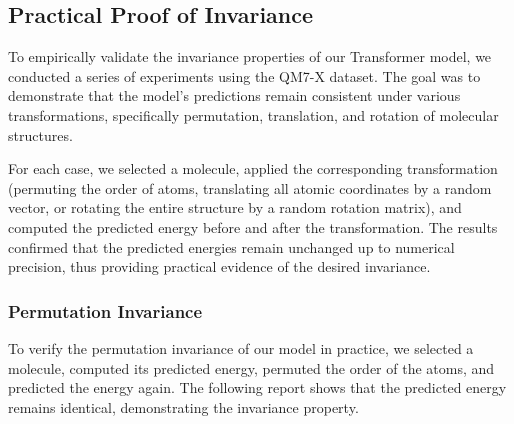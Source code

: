 \documentclass{article}
\begin{document}
\subsection{Practical Proof of Invariance}

To empirically validate the invariance properties of our Transformer model, we conducted a series of experiments using the QM7-X dataset. The goal was to demonstrate that the model's predictions remain consistent under various transformations, specifically permutation, translation, and rotation of molecular structures. \newline

For each case, we selected a molecule, applied the corresponding transformation (permuting the order of atoms, translating all atomic coordinates by a random vector, or rotating the entire structure by a random rotation matrix), and computed the predicted energy before and after the transformation. The results confirmed that the predicted energies remain unchanged up to numerical precision, thus providing practical evidence of the desired invariance.


\subsubsection{Permutation Invariance}



To verify the permutation invariance of our model in practice, we selected a molecule, computed its predicted energy, permuted the order of the atoms, and predicted the energy again. The following report shows that the predicted energy remains identical, demonstrating the invariance property.
\end{document}

